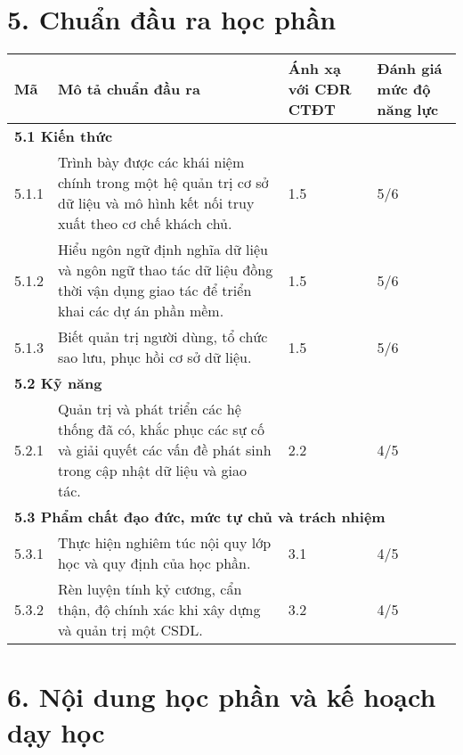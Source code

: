 \documentclass[a4paper,12pt]{article}
\begin{document}
\section*{5. Chuẩn đầu ra học phần}
\begin{longtable}{|p{2cm}|p{6.5cm}|p{2.5cm}|p{3cm}|}
\hline
\textbf{Mã} & \textbf{Mô tả chuẩn đầu ra} & \textbf{Ánh xạ với CĐR CTĐT} & \textbf{Đánh giá mức độ năng lực} \\
\hline
\multicolumn{4}{|l|}{\textbf{5.1 Kiến thức}} \\
\hline
5.1.1 & Trình bày được các khái niệm chính trong một hệ quản trị cơ sở dữ liệu và mô hình kết nối truy xuất theo cơ chế khách chủ. & 1.5 & 5/6 \\
\hline
5.1.2 & Hiểu ngôn ngữ định nghĩa dữ liệu và ngôn ngữ thao tác dữ liệu đồng thời vận dụng giao tác để triển khai các dự án phần mềm. & 1.5 & 5/6 \\
\hline
5.1.3 & Biết quản trị người dùng, tổ chức sao lưu, phục hồi cơ sở dữ liệu. & 1.5 & 5/6 \\
\hline
\multicolumn{4}{|l|}{\textbf{5.2 Kỹ năng}} \\
\hline
5.2.1 & Quản trị và phát triển các hệ thống đã có, khắc phục các sự cố và giải quyết các vấn đề phát sinh trong cập nhật dữ liệu và giao tác. & 2.2 & 4/5 \\
\hline
\multicolumn{4}{|l|}{\textbf{5.3 Phẩm chất đạo đức, mức tự chủ và trách nhiệm}} \\
\hline
5.3.1 & Thực hiện nghiêm túc nội quy lớp học và quy định của học phần. & 3.1 & 4/5 \\
\hline
5.3.2 & Rèn luyện tính kỷ cương, cẩn thận, độ chính xác khi xây dựng và quản trị một CSDL. & 3.2 & 4/5 \\
\hline
\end{longtable}

\section*{6. Nội dung học phần và kế hoạch dạy học}
\end{document}
